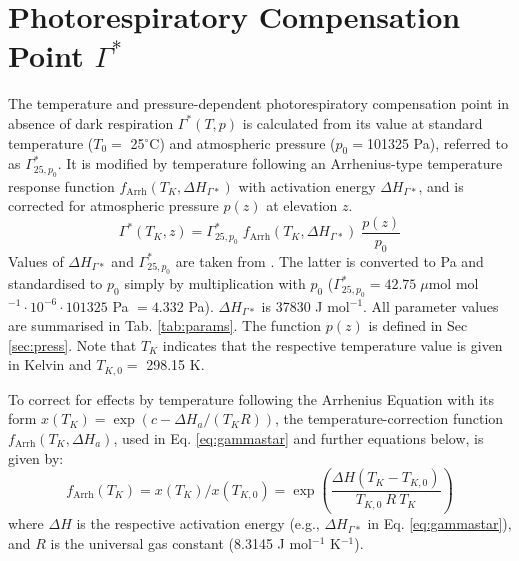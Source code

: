 \documentclass[gmd, manuscript]{copernicus}
\begin{document}
\section{Photorespiratory Compensation Point $\Gamma^\ast$}
\label{sec:gammastar}
The temperature and pressure-dependent photorespiratory compensation point in absence of dark respiration $\Gamma^\ast(T,p)$ is calculated from its value at standard temperature ($T_0=$ 25${^\circ}$C) and atmospheric pressure ($p_0 = $101325 Pa), referred to as $\Gamma^\ast_{25, p_0}$. It is modified by temperature following an Arrhenius-type temperature response function $f_{\text{Arrh}}(T_K, \Delta H_{\Gamma\ast})$ with activation energy $\Delta H_{\Gamma\ast}$, and is corrected for atmospheric pressure $p(z)$ at elevation $z$. 
\begin{equation}
\label{eq:gammastar}
    \Gamma^\ast (T_K, z) = \Gamma^\ast_{25, p_0} \; f_{\text{Arrh}}(T_K, \Delta H_{\Gamma\ast}) \; \frac{p(z)}{p_0}
\end{equation}
Values of $\Delta H_{\Gamma\ast}$ and $\Gamma^\ast_{25, p_0}$ are taken from \citet{bernacchi01}. The latter is converted to Pa and standardised to $p_0$ simply by multiplication with $p_0$ ($\Gamma^\ast_{25, p_0} = 42.75\; \mu$mol mol$^{-1} \cdot 10^{-6} \cdot 101325$ Pa $ = 4.332$ Pa). $\Delta H_{\Gamma\ast}$ is 37830 J mol$^{-1}$. All parameter values are summarised in Tab. \ref{tab:params}. The function $p(z)$ is defined in Sec \ref{sec:press}. Note that $T_K$ indicates that the respective temperature value is given in Kelvin and $T_{K,0}=$ 298.15 K.

To correct for effects by temperature following the Arrhenius Equation with its form $x(T_K)=\exp(c-\Delta H_a/(T_K R))$, the temperature-correction function $f_{\text{Arrh}}(T_K, \Delta H_a)$, used in Eq. \ref{eq:gammastar} and further equations below, is given by:
\begin{equation}
    f_{\text{Arrh}}(T_K) = x(T_K)/x(T_{K,0}) = \exp \left( \frac{\Delta H (T_K - T_{K,0})}{T_{K,0}\: R\: T_K} \right) 
\end{equation}
where $\Delta H$ is the respective activation energy (e.g., $\Delta H_{\Gamma\ast}$ in Eq. \ref{eq:gammastar}), and $R$ is the universal gas constant (8.3145 J mol$^{-1}$ K$^{-1}$).
\end{document}
